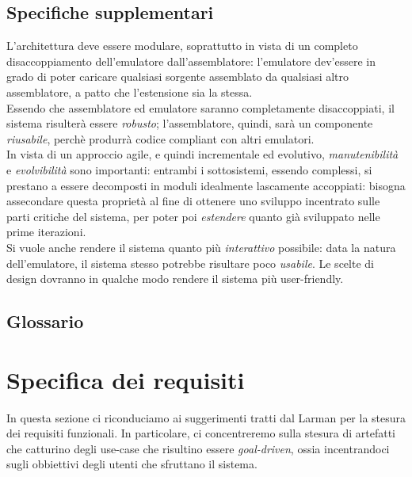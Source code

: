 \documentclass[11pt]{article}
\begin{document}
\subsection{Specifiche supplementari}
L'architettura deve essere modulare, soprattutto in vista di un completo disaccoppiamento dell'emulatore dall'assemblatore: l'emulatore dev'essere in grado di poter caricare qualsiasi sorgente assemblato da qualsiasi altro assemblatore, a patto che l'estensione sia la stessa.\\
Essendo che assemblatore ed emulatore saranno completamente disaccoppiati, il sistema risulterà essere \emph{robusto}; l'assemblatore, quindi, sarà un componente \emph{riusabile}, perchè produrrà codice compliant con altri emulatori.\\
In vista di un approccio agile, e quindi incrementale ed evolutivo, \emph{manutenibilità} e \emph{evolvibilità} sono importanti: entrambi i sottosistemi, essendo complessi, si prestano a essere decomposti in moduli idealmente lascamente accoppiati: bisogna assecondare questa proprietà al fine di ottenere uno sviluppo incentrato sulle parti critiche del sistema, per poter poi \emph{estendere} quanto già sviluppato nelle prime iterazioni.\\
Si vuole anche rendere il sistema quanto più \emph{interattivo} possibile: data la natura dell'emulatore, il sistema stesso potrebbe risultare poco \emph{usabile}. Le scelte di design dovranno in qualche modo rendere il sistema più user-friendly.
\subsection{Glossario}
\clearpage

\section{Specifica dei requisiti}
In questa sezione ci riconduciamo ai suggerimenti tratti dal Larman per la stesura dei requisiti funzionali. In particolare, ci concentreremo sulla stesura di artefatti che catturino degli use-case che risultino essere \emph{goal-driven}, ossia incentrandoci sugli obbiettivi degli utenti che sfruttano il sistema.
\end{document}
